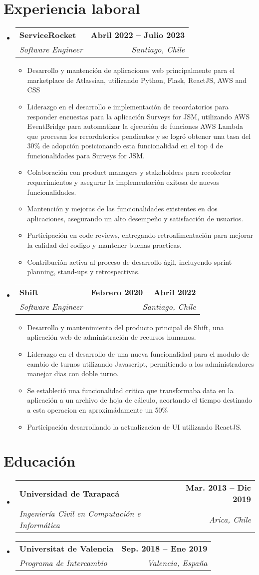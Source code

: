 \documentclass[letterpaper,11pt]{article}
\makeatletter
\newcommand{\resumeItem}[1]{
  \item\small{
    {#1 \vspace{-2pt}}
  }
}
\newcommand{\resumeSubheading}[4]{
  \vspace{-2pt}\item
    \begin{tabular*}{1.0\textwidth}[t]{l@{\extracolsep{\fill}}r}
      \textbf{#1} & \textbf{\small #2} \\
      \textit{\small#3} & \textit{\small #4} \\
    \end{tabular*}\vspace{-7pt}
}
\newcommand{\resumeSubHeadingListStart}{\begin{itemize}[leftmargin=0.0in, label={}]}
\newcommand{\resumeSubHeadingListEnd}{\end{itemize}}
\newcommand{\resumeItemListStart}{\begin{itemize}}
\newcommand{\resumeItemListEnd}{\end{itemize}\vspace{-5pt}}
\makeatother
\begin{document}
\section{Experiencia laboral}
  \resumeSubHeadingListStart
    \resumeSubheading
      {ServiceRocket}{Abril 2022 -- Julio 2023}
      {Software Engineer}{Santiago, Chile}
      \resumeItemListStart
        \resumeItem{Desarrollo y mantención de aplicaciones web principalmente para el marketplace de Atlassian, utilizando Python, Flask, ReactJS, AWS and CSS}
        \resumeItem{Liderazgo en el desarrollo e implementación de recordatorios para responder
        encuestas para la aplicación Surveys for JSM, utilizando AWS EventBridge para automatizar
        la ejecución de funciones AWS Lambda que procesan los recordatorios pendientes y se logró
        obtener una tasa del 30\% de adopción posicionando esta funcionalidad en el top 4 de
        funcionalidades para Surveys for JSM.}
        \resumeItem{Colaboración con product managers y stakeholders para recolectar requerimientos y asegurar la implementación exitosa de nuevas funcionalidades.}
        \resumeItem{Mantención y mejoras de las funcionalidades existentes en dos aplicaciones, asegurando un alto desempeño y satisfacción de usuarios.}
        \resumeItem{Participación en code reviews, entregando retroalimentación para mejorar la calidad del codigo y mantener buenas practicas.}
        \resumeItem{Contribución activa al proceso de desarrollo ágil, incluyendo sprint planning, stand-ups y retrospectivas.}
      \resumeItemListEnd
    \resumeSubheading
      {Shift}{Febrero 2020 -- Abril 2022}
      {Software Engineer}{Santiago, Chile}
      \resumeItemListStart
        \resumeItem{Desarrollo y mantenimiento del producto principal de Shift, una aplicación web de administración de recursos humanos.}
        \resumeItem{Liderazgo en el desarrollo de una nueva funcionalidad para el modulo de cambio de turnos utilizando Javascript, permitiendo a los administradores manejar dias con doble turno.}
        \resumeItem{Se estableció una funcionalidad critica que transformaba data en la aplicación
        a un archivo de hoja de cálculo, acortando el tiempo destinado a esta operacion en 
        aproximádamente un 50\%}
        \resumeItem{Participación desarrollando la actualizacion de UI utilizando ReactJS.}
      \resumeItemListEnd  
  \resumeSubHeadingListEnd
\vspace{-16pt}


\section{Educación}
  \resumeSubHeadingListStart
    \resumeSubheading
      {Universidad de Tarapacá}{Mar. 2013 -- Dic 2019}
      {Ingeniería Civil en Computación e Informática}{Arica, Chile}
    \resumeSubheading
      {Universitat de Valencia}{Sep. 2018 -- Ene 2019}
      {Programa de Intercambio}{Valencia, España}
  \resumeSubHeadingListEnd
\end{document}
